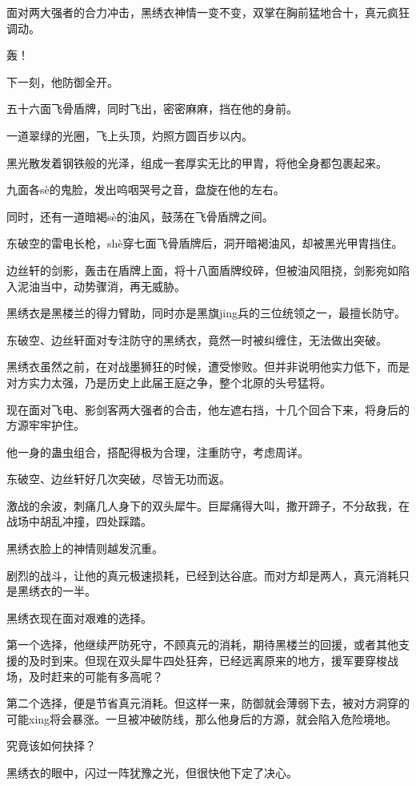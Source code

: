 \begin{this_body}
面对两大强者的合力冲击，黑绣衣神情一变不变，双掌在胸前猛地合十，真元疯狂调动。

轰！

下一刻，他防御全开。

五十六面飞骨盾牌，同时飞出，密密麻麻，挡在他的身前。

一道翠绿的光圈，飞上头顶，灼照方圆百步以内。

黑光散发着钢铁般的光泽，组成一套厚实无比的甲胄，将他全身都包裹起来。

九面各sè的鬼脸，发出呜咽哭号之音，盘旋在他的左右。

同时，还有一道暗褐sè的油风，鼓荡在飞骨盾牌之间。

东破空的雷电长枪，shè穿七面飞骨盾牌后，洞开暗褐油风，却被黑光甲胄挡住。

边丝轩的剑影，轰击在盾牌上面，将十八面盾牌绞碎，但被油风阻挠，剑影宛如陷入泥油当中，动势骤消，再无威胁。

黑绣衣是黑楼兰的得力臂助，同时亦是黑旗jing兵的三位统领之一，最擅长防守。

东破空、边丝轩面对专注防守的黑绣衣，竟然一时被纠缠住，无法做出突破。

黑绣衣虽然之前，在对战墨狮狂的时候，遭受惨败。但并非说明他实力低下，而是对方实力太强，乃是历史上此届王庭之争，整个北原的头号猛将。

现在面对飞电、影剑客两大强者的合击，他左遮右挡，十几个回合下来，将身后的方源牢牢护住。

他一身的蛊虫组合，搭配得极为合理，注重防守，考虑周详。

东破空、边丝轩好几次突破，尽皆无功而返。

激战的余波，刺痛几人身下的双头犀牛。巨犀痛得大叫，撒开蹄子，不分敌我，在战场中胡乱冲撞，四处踩踏。

黑绣衣脸上的神情则越发沉重。

剧烈的战斗，让他的真元极速损耗，已经到达谷底。而对方却是两人，真元消耗只是黑绣衣的一半。

黑绣衣现在面对艰难的选择。

第一个选择，他继续严防死守，不顾真元的消耗，期待黑楼兰的回援，或者其他支援的及时到来。但现在双头犀牛四处狂奔，已经远离原来的地方，援军要穿梭战场，及时赶来的可能有多高呢？

第二个选择，便是节省真元消耗。但这样一来，防御就会薄弱下去，被对方洞穿的可能xing将会暴涨。一旦被冲破防线，那么他身后的方源，就会陷入危险境地。

究竟该如何抉择？

黑绣衣的眼中，闪过一阵犹豫之光，但很快他下定了决心。


\end{this_body}

